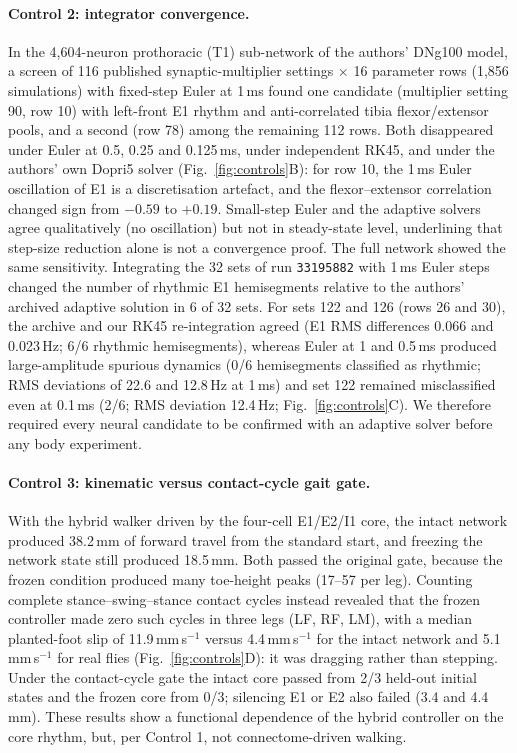 \documentclass[11pt]{article}
\begin{document}
\paragraph{Control 2: integrator convergence.}
In the 4,604-neuron prothoracic (T1) sub-network of the authors' DNg100 model, a screen of 116 published synaptic-multiplier settings $\times$ 16 parameter rows (1,856 simulations) with fixed-step Euler at 1\,ms found one candidate (multiplier setting 90, row 10) with left-front E1 rhythm and anti-correlated tibia flexor/extensor pools, and a second (row 78) among the remaining 112 rows. Both disappeared under Euler at 0.5, 0.25 and 0.125\,ms, under independent RK45, and under the authors' own Dopri5 solver (Fig.~\ref{fig:controls}B): for row 10, the 1\,ms Euler oscillation of E1 is a discretisation artefact, and the flexor--extensor correlation changed sign from $-0.59$ to $+0.19$. Small-step Euler and the adaptive solvers agree qualitatively (no oscillation) but not in steady-state level, underlining that step-size reduction alone is not a convergence proof. The full network showed the same sensitivity. Integrating the 32 sets of run \texttt{33195882} with 1\,ms Euler steps changed the number of rhythmic E1 hemisegments relative to the authors' archived adaptive solution in 6 of 32 sets. For sets 122 and 126 (rows 26 and 30), the archive and our RK45 re-integration agreed (E1 RMS differences 0.066 and 0.023\,Hz; 6/6 rhythmic hemisegments), whereas Euler at 1 and 0.5\,ms produced large-amplitude spurious dynamics (0/6 hemisegments classified as rhythmic; RMS deviations of 22.6 and 12.8\,Hz at 1\,ms) and set 122 remained misclassified even at 0.1\,ms (2/6; RMS deviation 12.4\,Hz; Fig.~\ref{fig:controls}C). We therefore required every neural candidate to be confirmed with an adaptive solver before any body experiment.

\paragraph{Control 3: kinematic versus contact-cycle gait gate.}
With the hybrid walker driven by the four-cell E1/E2/I1 core, the intact network produced 38.2\,mm of forward travel from the standard start, and freezing the network state still produced 18.5\,mm. Both passed the original gate, because the frozen condition produced many toe-height peaks (17--57 per leg). Counting complete stance--swing--stance contact cycles instead revealed that the frozen controller made zero such cycles in three legs (LF, RF, LM), with a median planted-foot slip of 11.9\,mm\,s$^{-1}$ versus 4.4\,mm\,s$^{-1}$ for the intact network and 5.1\,mm\,s$^{-1}$ for real flies (Fig.~\ref{fig:controls}D): it was dragging rather than stepping. Under the contact-cycle gate the intact core passed from 2/3 held-out initial states and the frozen core from 0/3; silencing E1 or E2 also failed (3.4 and 4.4\,mm). These results show a functional dependence of the hybrid controller on the core rhythm, but, per Control 1, not connectome-driven walking.
\end{document}
